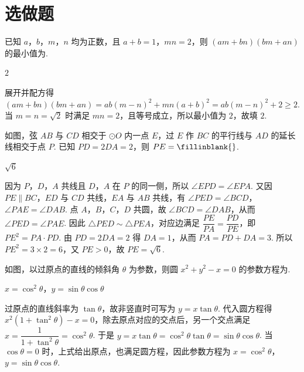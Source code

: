 \section{选做题}

\begin{problem}
已知 \(a\)，\(b\)，\(m\)，\(n\) 均为正数，且 \(a+b=1\)，\(mn=2\)，则 \((am+bn)(bm+an)\) 的最小值为\fillinblank{}.

\begin{answer}
\(2\)
\end{answer}

\begin{solution}
展开并配方得 \((am+bn)(bm+an)=ab(m-n)^2+mn(a+b)^2=ab(m-n)^2+2\geqslant2\). 当 \(m=n=\sqrt2\) 时满足 \(mn=2\)，且等号成立，所以最小值为 \(2\)，故填 \(2\).
\end{solution}
\end{problem}

\begin{problem}
如图，弦 \(AB\) 与 \(CD\) 相交于 \(\odot O\) 内一点 \(E\)，过 \(E\) 作 \(BC\) 的平行线与 \(AD\) 的延长线相交于点 \(P\). 已知 \(PD=2DA=2\)，则 \(PE=\fillinblank{}\).


\begin{answer}
\(\sqrt6\)
\end{answer}

\begin{solution}
因为 \(P\)，\(D\)，\(A\) 共线且 \(D\)，\(A\) 在 \(P\) 的同一侧，所以 \(\angle EPD=\angle EPA\). 又因 \(PE\parallel BC\)，\(ED\) 与 \(CD\) 共线，\(EA\) 与 \(AB\) 共线，有 \(\angle PED=\angle BCD\)，\(\angle PAE=\angle DAB\). 点 \(A\)，\(B\)，\(C\)，\(D\) 共圆，故 \(\angle BCD=\angle DAB\)，从而 \(\angle PED=\angle PAE\). 因此 \(\triangle PED\sim\triangle PEA\)，对应边满足 \(\dfrac{PE}{PA}=\dfrac{PD}{PE}\)，即 \(PE^2=PA\cdot PD\). 由 \(PD=2DA=2\) 得 \(DA=1\)，从而 \(PA=PD+DA=3\). 所以 \(PE^2=3\times2=6\)，又 \(PE>0\)，故 \(PE=\sqrt6\).
\end{solution}
\end{problem}

\begin{problem}
如图，以过原点的直线的倾斜角 \(\theta\) 为参数，则圆 \(x^2+y^2-x=0\) 的参数方程为\fillinblank{}.


\begin{answer}
\(x=\cos^2\theta\)，\(y=\sin\theta\cos\theta\)
\end{answer}

\begin{solution}
过原点的直线斜率为 \(\tan\theta\)，故非竖直时可写为 \(y=x\tan\theta\). 代入圆方程得 \(x^2(1+\tan^2\theta)-x=0\)，除去原点对应的交点后，另一个交点满足 \(x=\dfrac{1}{1+\tan^2\theta}=\cos^2\theta\). 于是 \(y=x\tan\theta=\cos^2\theta\tan\theta=\sin\theta\cos\theta\). 当 \(\cos\theta=0\) 时，上式给出原点，也满足圆方程，因此参数方程为 \(x=\cos^2\theta\)，\(y=\sin\theta\cos\theta\).
\end{solution}
\end{problem}

